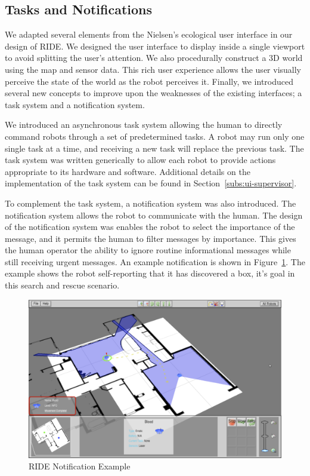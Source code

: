 \subsection{Tasks and Notifications}
We adapted several elements from the Nielsen's ecological user interface in our design of RIDE. We designed the user interface to display inside a single viewport to avoid splitting the user's attention. We also procedurally construct a 3D world using the map and sensor data. This rich user experience allows the user visually perceive the state of the world as the robot perceives it. Finally, we introduced several new concepts to improve upon the weaknesses of the existing interfaces; a task system and a notification system.

We introduced an asynchronous task system allowing the human to directly command robots through a set of predetermined tasks. A robot may run only one single task at a time, and receiving a new task will replace the previous task. The task system was written generically to allow each robot to provide actions appropriate to its hardware and software. Additional details on the implementation of the task system can be found in Section~\ref{subs:ui-supervisor}.

To complement the task system, a notification system was also introduced. The notification system allows the robot to communicate with the human. The design of the notification system was enables the robot to select the importance of the message, and it permits the human to filter messages by importance. This gives the human operator the ability to ignore routine informational messages while still receiving urgent messages. An example notification is shown in Figure~\ref{fig:ride-notification}. The example shows the robot self-reporting that it has discovered a box, it's goal in this search and rescue scenario.

\begin{figure}[ht]
\begin{center}
\includegraphics[width=6.10in]{images/ride-notification.png}
\caption{RIDE Notification Example\label{fig:ride-notification}}
\end{center}
\end{figure}

